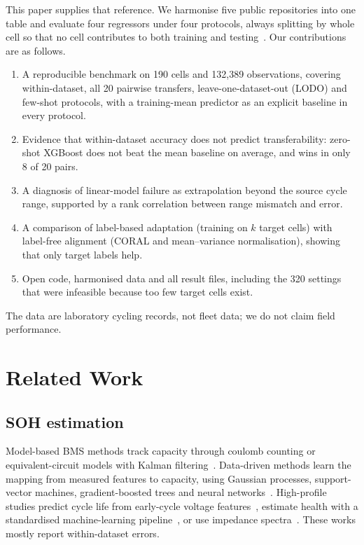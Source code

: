 \documentclass[journal]{IEEEtran}
\begin{document}
This paper supplies that reference. We harmonise five public repositories into one table and evaluate four regressors under four protocols, always splitting by whole cell so that no cell contributes to both training and testing~\cite{kaufman2012leakage,kapoor2023leakage}. Our contributions are as follows.
\begin{enumerate}
\item A reproducible benchmark on 190 cells and 132,389 observations, covering within-dataset, all 20 pairwise transfers, leave-one-dataset-out (LODO) and few-shot protocols, with a training-mean predictor as an explicit baseline in every protocol.
\item Evidence that within-dataset accuracy does not predict transferability: zero-shot XGBoost does not beat the mean baseline on average, and wins in only 8 of 20 pairs.
\item A diagnosis of linear-model failure as extrapolation beyond the source cycle range, supported by a rank correlation between range mismatch and error.
\item A comparison of label-based adaptation (training on $k$ target cells) with label-free alignment (CORAL and mean--variance normalisation), showing that only target labels help.
\item Open code, harmonised data and all result files, including the 320 settings that were infeasible because too few target cells exist.
\end{enumerate}
The data are laboratory cycling records, not fleet data; we do not claim field performance.

\section{Related Work}
\subsection{SOH estimation}
Model-based BMS methods track capacity through coulomb counting or equivalent-circuit models with Kalman filtering~\cite{plett2004ekf}. Data-driven methods learn the mapping from measured features to capacity, using Gaussian processes, support-vector machines, gradient-boosted trees and neural networks~\cite{li2019datadriven,hu2020battery}. High-profile studies predict cycle life from early-cycle voltage features~\cite{severson2019}, estimate health with a standardised machine-learning pipeline~\cite{roman2021}, or use impedance spectra~\cite{zhang2020impedance}. These works mostly report within-dataset errors.
\end{document}
